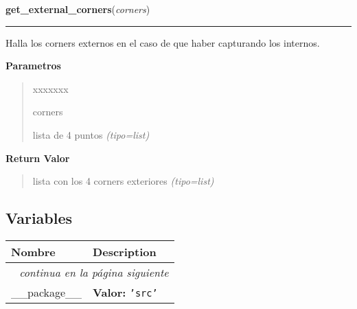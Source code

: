 \hspace{.8\funcindent}\begin{boxedminipage}{\funcwidth}

    \raggedright \textbf{get\_external\_corners}(\textit{corners})

    \vspace{-1.5ex}

    \rule{\textwidth}{0.5\fboxrule}
\setlength{\parskip}{2ex}
Halla los corners externos en el caso de que haber capturando los internos.

\setlength{\parskip}{1ex}
      \textbf{Parametros}
      \vspace{-1ex}

      \begin{quote}
        \begin{Ventry}{xxxxxxx}

          \item[corners]


lista de 4 puntos
            {\it (tipo=list)}

        \end{Ventry}

      \end{quote}

      \textbf{Return Valor}
    \vspace{-1ex}

      \begin{quote}

lista con los 4 corners exteriores
      {\it (tipo=list)}

      \end{quote}

    \end{boxedminipage}



  \subsection{Variables}

    \vspace{-1cm}
\hspace{\varindent}\begin{longtable}{|p{\varnamewidth}|p{\vardescrwidth}|l}
\cline{1-2}
\cline{1-2} \centering \textbf{Nombre} & \centering \textbf{Description}& \\
\cline{1-2}
\endhead\cline{1-2}\multicolumn{3}{r}{\small\textit{continua en la página siguiente}}\\\endfoot\cline{1-2}
\endlastfoot\raggedright \_\-\_\-p\-a\-c\-k\-a\-g\-e\-\_\-\_\- & \raggedright \textbf{Valor:} 
{\tt \texttt{'}\texttt{src}\texttt{'}}&\\
\cline{1-2}
\end{longtable}


